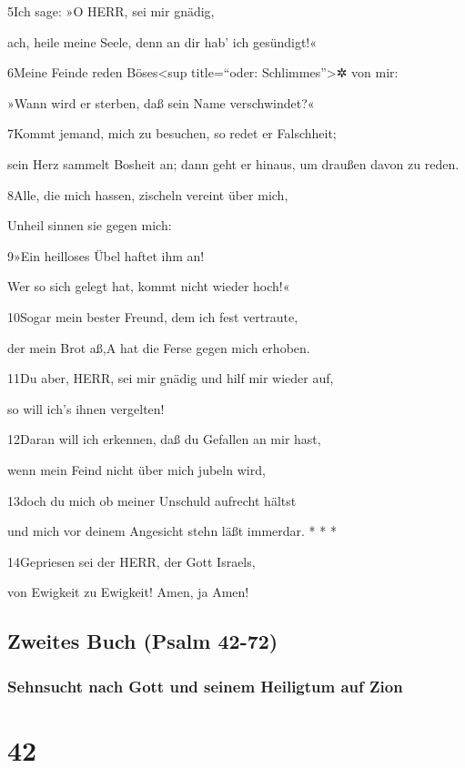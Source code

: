 5Ich sage: »O HERR, sei mir gnädig,

ach, heile meine Seele, denn an dir hab' ich gesündigt!«

6Meine Feinde reden Böses\textless sup title=``oder:
Schlimmes''\textgreater✲ von mir:

»Wann wird er sterben, daß sein Name verschwindet?«

7Kommt jemand, mich zu besuchen, so redet er Falschheit;

sein Herz sammelt Bosheit an; dann geht er hinaus, um draußen davon zu
reden.

8Alle, die mich hassen, zischeln vereint über mich,

Unheil sinnen sie gegen mich:

9»Ein heilloses Übel haftet ihm an!

Wer so sich gelegt hat, kommt nicht wieder hoch!«

10Sogar mein bester Freund, dem ich fest vertraute,

der mein Brot aß,{A} hat die Ferse gegen mich erhoben.

11Du aber, HERR, sei mir gnädig und hilf mir wieder auf,

so will ich's ihnen vergelten!

12Daran will ich erkennen, daß du Gefallen an mir hast,

wenn mein Feind nicht über mich jubeln wird,

13doch du mich ob meiner Unschuld aufrecht hältst

und mich vor deinem Angesicht stehn läßt immerdar. * * *

14Gepriesen sei der HERR, der Gott Israels,

von Ewigkeit zu Ewigkeit! Amen, ja Amen!

\hypertarget{zweites-buch-psalm-42-72}{%
\subsection{Zweites Buch (Psalm 42-72)}\label{zweites-buch-psalm-42-72}}

\hypertarget{sehnsucht-nach-gott-und-seinem-heiligtum-auf-zion}{%
\subsubsection{Sehnsucht nach Gott und seinem Heiligtum auf
Zion}\label{sehnsucht-nach-gott-und-seinem-heiligtum-auf-zion}}

\hypertarget{section-41}{%
\section{42}\label{section-41}}

